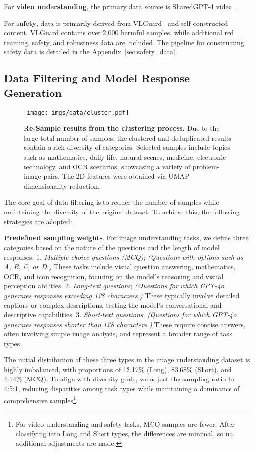 For \textbf{video understanding}, the primary data source is SharedGPT-4 video~\cite{chen2024sharegpt4video}.

For \textbf{safety}, data is primarily derived from VLGuard~\cite{zong2024safety} and self-constructed content. VLGuard contains over 2,000 harmful samples, while additional red teaming, safety, and robustness data are included. The pipeline for constructing safety data is detailed in the Appendix~\ref{sec:safety_data}.


\subsection{Data Filtering and Model Response Generation}
\begin{figure}
    \centering
    \texttt{[image: imgs/data/cluster.pdf]}
    \caption{\textbf{Re-Sample results from the clustering process.} Due to the large total number of samples, the clustered and deduplicated results contain a rich diversity of categories. Selected samples include topics such as mathematics, daily life, natural scenes, medicine, electronic technology, and OCR scenarios, showcasing a variety of problem-image pairs. The 2D features were obtained via UMAP dimensionality reduction.}
    \label{fig:data_cluster}
\end{figure}
The core goal of data filtering is to reduce the number of samples while maintaining the diversity of the original dataset. To achieve this, the following strategies are adopted:

\textbf{Predefined sampling weights}.
For image understanding tasks, we define three categories based on the nature of the questions and the length of model responses:
1. \textit{Multiple-choice questions (MCQ)}; \textit{(Questions with options such as A, B, C, or D.)} These tasks include visual question answering, mathematics, OCR, and icon recognition, focusing on the model's reasoning and visual perception abilities.
2. \textit{Long-text questions}; \textit{(Questions for which GPT-4o generates responses exceeding 128 characters.)} These typically involve detailed captions or complex descriptions, testing the model's conversational and descriptive capabilities.
3. \textit{Short-text questions}; \textit{(Questions for which GPT-4o generates responses shorter than 128 characters.)} These require concise answers, often involving simple image analysis, and represent a broader range of task types.

The initial distribution of these three types in the image understanding dataset is highly imbalanced, with proportions of 12.17\% (Long), 83.68\% (Short), and 4.14\% (MCQ). To align with diversity goals, we adjust the sampling ratio to 4:5:1, reducing disparities among task types while maintaining a dominance of comprehensive samples\footnote{For video understanding and safety tasks, MCQ samples are fewer. After classifying into Long and Short types, the differences are minimal, so no additional adjustments are made.}. 

